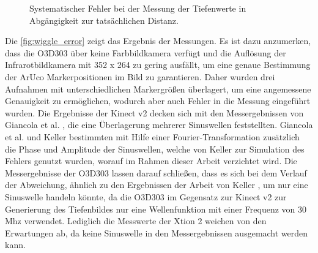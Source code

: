 \documentclass[thesis.tex]{subfiles}
\begin{document}
\begin{figure}[hp!]
\begin{subfigure}{\textwidth}
\centering
{}
\end{subfigure}

\caption{Systematischer Fehler bei der Messung der Tiefenwerte in Abgängigkeit zur tatsächlichen Distanz.}
\label{fig:wiggle_error}
\end{figure}

Die \autoref{fig:wiggle_error} zeigt das Ergebnis der Messungen. Es ist dazu anzumerken, dass die O3D303 über keine Farbbildkamera verfügt und die Auflösung der Infrarotbildkamera mit 352 x 264 zu gering ausfällt, um eine genaue Bestimmung der ArUco Markerpositionen im Bild zu garantieren. Daher wurden drei Aufnahmen mit unterschiedlichen Markergrößen überlagert, um eine angemessene Genauigkeit zu ermöglichen, wodurch aber auch Fehler in die Messung eingeführt wurden. Die Ergebnisse der Kinect v2 decken sich mit den Messergebnissen von Giancola et al. \cite{bib:Giancola2018}, die eine Überlagerung mehrerer Sinuswellen feststellten. Giancola et al. \cite{bib:Giancola2018} und Keller \cite{bib:Keller2015} bestimmten mit Hilfe einer Fourier-Transformation zusätzlich die Phase und Amplitude der Sinuswellen, welche von Keller \cite{bib:Keller2015} zur Simulation des Fehlers genutzt wurden, worauf im Rahmen dieser Arbeit verzichtet wird. Die Messergebnisse der O3D303 lassen darauf schließen, dass es sich bei dem Verlauf der Abweichung, ähnlich zu den Ergebnissen der Arbeit von Keller \cite{bib:Keller2015}, um nur eine Sinuswelle handeln könnte, da die O3D303 im Gegensatz zur Kinect v2 zur Generierung des Tiefenbildes nur eine Wellenfunktion mit einer Frequenz von 30 Mhz verwendet. Lediglich die Messwerte der Xtion 2 weichen von den Erwartungen ab, da keine Sinuswelle in den Messergebnissen ausgemacht werden kann.
%
\end{document}
